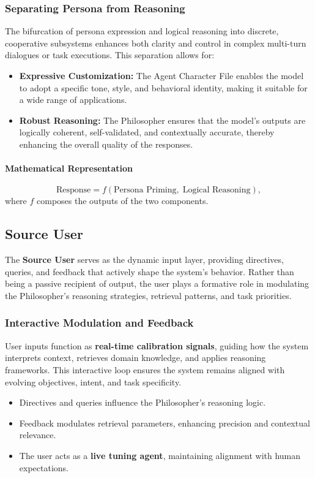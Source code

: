 \documentclass{article}
\begin{document}
\subsubsection{\textbf{Separating Persona from Reasoning}}
The bifurcation of persona expression and logical reasoning into discrete, cooperative subsystems enhances both clarity and control in complex multi-turn dialogues or task executions. This separation allows for:
\begin{itemize}
    \item \textbf{Expressive Customization:} The Agent Character File enables the model to adopt a specific tone, style, and behavioral identity, making it suitable for a wide range of applications.
    \item \textbf{Robust Reasoning:} The Philosopher ensures that the model’s outputs are logically coherent, self-validated, and contextually accurate, thereby enhancing the overall quality of the responses.
\end{itemize}

\paragraph{Mathematical Representation}
\[
\text{Response} = f(\text{Persona Priming},\; \text{Logical Reasoning}),
\]
where $f$ composes the outputs of the two components.

\subsection{Source User}
The \textbf{Source User} serves as the dynamic input layer, providing directives, queries, and feedback that actively shape the system’s behavior. Rather than being a passive recipient of output, the user plays a formative role in modulating the Philosopher’s reasoning strategies, retrieval patterns, and task priorities.

\subsubsection{Interactive Modulation and Feedback}
User inputs function as \textbf{real-time calibration signals}, guiding how the system interprets context, retrieves domain knowledge, and applies reasoning frameworks. This interactive loop ensures the system remains aligned with evolving objectives, intent, and task specificity.


\begin{itemize}
  \item Directives and queries influence the Philosopher’s reasoning logic.
  \item Feedback modulates retrieval parameters, enhancing precision and contextual relevance.
  \item The user acts as a \textbf{live tuning agent}, maintaining alignment with human expectations.
\end{itemize}
\end{document}

